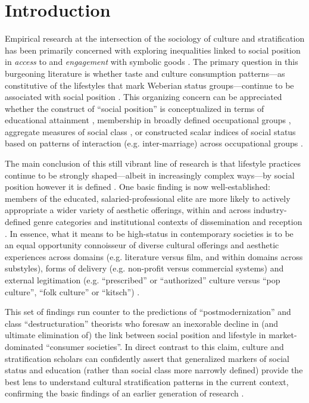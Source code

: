 \newpage
\section{Introduction} 
Empirical research at the intersection of the sociology of culture and stratification has been primarily concerned  with exploring inequalities linked to social position in \emph{access} to and \emph{engagement} with symbolic goods  \citep{katzgerro04}.  The primary question in this burgeoning literature is whether taste and culture consumption patterns---as constitutive of the lifestyles that mark Weberian status groups---continue to be associated with social position \citep{tomlinson03}.  This organizing concern can be appreciated whether the construct of ``social position'' is conceptualized in terms of educational attainment \citep{ warde_etal08}, membership in broadly defined occupational groups \citep{tomlinson03}, aggregate measures of social class \citep{katzgerro06}, or constructed scalar indices of social status based on patterns of interaction (e.g. inter-marriage) across occupational groups \citep{chan_goldthorpe07a}. 

The main conclusion of this still vibrant line of research is that lifestyle practices continue to be strongly shaped---albeit in increasingly complex ways---by social position however it is defined \citep{bennett_etal08}.  One basic finding is now well-established:  members of the educated, salaried-professional elite are more likely to actively appropriate a wider variety of aesthetic offerings, within and across industry-defined genre categories and institutional contexts of dissemination and reception \citep{peterson05, warde08, lizardo08, prieur_savage11}. In essence, what it means to be high-status in contemporary societies is to be an equal opportunity connoisseur of diverse cultural offerings and aesthetic experiences across domains (e.g. literature versus film, and within domains across substyles), forms of delivery (e.g. non-profit versus commercial systems) and external legitimation (e.g. ``prescribed'' or ``authorized'' culture versus ``pop culture'', ``folk culture'' or ``kitsch'') \citep{peterson_kern96, bennett_etal08, prieur_savage11}.
	
This set of findings run counter to the predictions of ``postmodernization'' and class ``destructuration'' theorists who foresaw an inexorable decline in (and ultimate elimination of) the link between social position and lifestyle in market-dominated ``consumer societies''\citep[e.g.][]{pakulski_waters96}. In direct contrast to this claim, culture and stratification scholars can confidently assert that generalized markers of social status and education (rather than social class more narrowly defined) provide the best lens to understand cultural stratification patterns in the current context, confirming the basic findings of an earlier generation of research \citep{dimaggio_useem78a}. 


